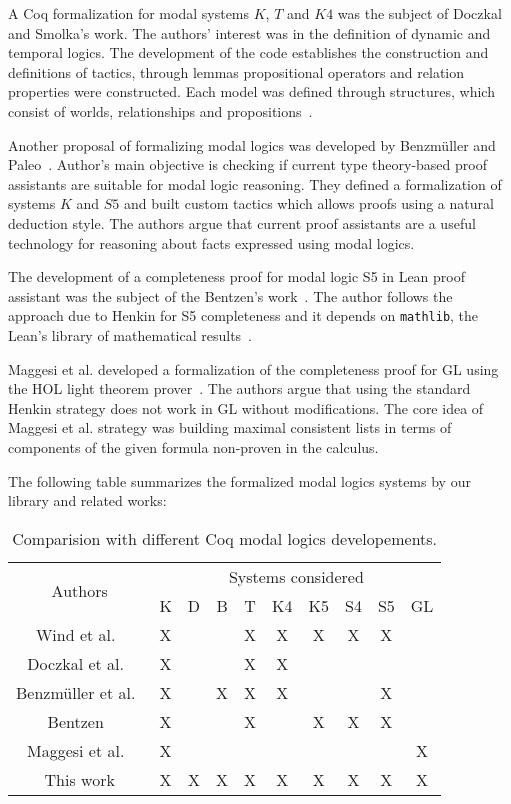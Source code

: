 \documentclass[3p,times]{elsarticle}
\begin{document}
A Coq formalization for modal systems $K$, $T$ and $K4$ was the subject of
Doczkal and Smolka's work. The authors' interest was in the definition of dynamic
and temporal logics. The development of the code establishes the construction
and definitions of tactics, through lemmas propositional operators and relation
properties were constructed. Each model was defined through structures, which
consist of worlds, relationships and propositions~\cite{saarland}.

Another proposal of formalizing modal logics was developed by Benzmüller and
Paleo~\cite{Chris_Bruno}. Author's main objective is checking if current
type theory-based proof assistants are suitable for modal logic reasoning.
They defined a formalization of systems $K$ and $S5$ and built custom tactics
which allows proofs using a natural deduction style.
The authors argue that current proof assistants are a useful technology for
reasoning about facts expressed using modal logics.

The development of a completeness proof for modal logic S5 in Lean proof
assistant was the subject of the Bentzen's work~\cite{Bentzen2021}. The author
follows the approach due to Henkin for S5 completeness and it depends on
\texttt{mathlib}, the Lean's library of mathematical results~\cite{mathlib20}.

Maggesi et al. developed a formalization of the completeness proof for GL using
the HOL light theorem prover~\cite{Maggesi21}. The authors argue that using the
standard Henkin strategy does not work in GL without modifications. The core idea of
Maggesi et al. strategy was building maximal consistent lists in terms of
components of the given formula non-proven in the calculus.

The following table summarizes the formalized modal logics systems by our library
and related works:
\vspace{0.5cm} {
  \begin{table}[H]
    \begin{tabular}{|c|c|c|c|c|c|c|c|c|c|}
      \hline
      \multirow{2}{*}{Authors} & \multicolumn{9}{c|}{Systems considered} \\ \cline{2-10}
                               & K & D & B & T & K4 & K5 & S4 & S5 & GL\\ \hline
      Wind et al.~\cite{dewind}     & X &   &   & X & X  & X  & X  &  X & \\ \hline
      Doczkal et al.~\cite{saarland}   & X &   &   & X & X  &    &    &  &  \\ \hline
      Benzmüller et al.~\cite{Chris_Bruno}& X &   & X & X &  X &    &    & X &  \\ \hline
      Bentzen~\cite{Bentzen2021} & X & & & X & & X & X & X & \\ \hline
      Maggesi et al.~\cite{Maggesi21} & X & & & & & & & & X \\ \hline
      This work         & X & X & X & X & X  &  X &  X & X  & X \\ \hline
    \end{tabular}
    \centering
    \caption{Comparision with different Coq modal logics developements.}
    \label{tab:comparacao_trabalhos_rel}
  \end{table}
}
\end{document}
